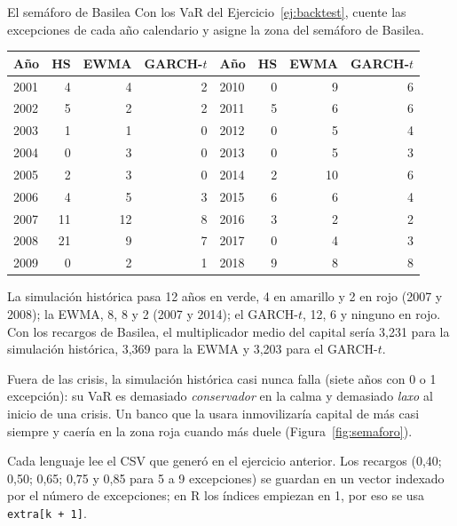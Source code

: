 \begin{ejresuelto}{El semáforo de Basilea}\label{ej:semaforo}
\enunciado Con los VaR del Ejercicio~\ref{ej:backtest}, cuente las excepciones de cada año calendario y asigne la zona
del semáforo de Basilea.

\solucion
{}
\begin{center}\small
\begin{tabular}{@{}lrrr|lrrr@{}}
\toprule
Año & HS & EWMA & GARCH-$t$ & Año & HS & EWMA & GARCH-$t$ \\
\midrule
2001 & 4 & 4 & 2 & 2010 & 0 & 9 & 6 \\
2002 & 5 & 2 & 2 & 2011 & 5 & 6 & 6 \\
2003 & 1 & 1 & 0 & 2012 & 0 & 5 & 4 \\
2004 & 0 & 3 & 0 & 2013 & 0 & 5 & 3 \\
2005 & 2 & 3 & 0 & 2014 & 2 & 10 & 6 \\
2006 & 4 & 5 & 3 & 2015 & 6 & 6 & 4 \\
2007 & 11 & 12 & 8 & 2016 & 3 & 2 & 2 \\
2008 & 21 & 9 & 7 & 2017 & 0 & 4 & 3 \\
2009 & 0 & 2 & 1 & 2018 & 9 & 8 & 8 \\
\bottomrule
\end{tabular}
\end{center}

 La simulación histórica pasa 12 años en verde, 4 en amarillo y 2 en rojo (2007 y 2008); la EWMA,
8, 8 y 2 (2007 y 2014); el GARCH-$t$, 12, 6 y ninguno en rojo. Con los recargos de Basilea, el multiplicador medio del
capital sería 3,231 para la simulación histórica, 3,369 para la EWMA y 3,203 para el GARCH-$t$.

 Fuera de las crisis, la simulación histórica casi nunca falla
(siete años con 0 o 1 excepción): su VaR es demasiado \emph{conservador} en la calma y demasiado \emph{laxo} al
inicio de una crisis. Un banco que la usara inmovilizaría capital de más casi siempre y caería en la zona roja cuando
más duele (Figura~\ref{fig:semaforo}).


\RvsPy Cada lenguaje lee el CSV que generó en el ejercicio anterior. Los recargos (0,40; 0,50; 0,65; 0,75 y 0,85 para 5 a 9
excepciones) se guardan en un vector indexado por el número de excepciones; en R los índices empiezan en 1, por eso
se usa \texttt{extra[k + 1]}.


\end{ejresuelto}
